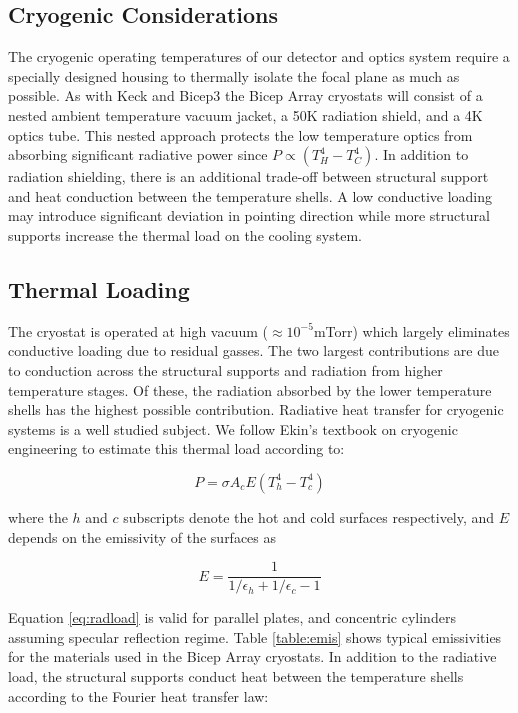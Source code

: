 \documentclass[12pt]{article}
\begin{document}
\subsection{Cryogenic Considerations}
The cryogenic operating temperatures of our detector and optics system require
a specially designed housing to thermally isolate the focal plane as much as
possible. As with Keck and Bicep3 the Bicep Array cryostats will consist of a
nested ambient temperature vacuum jacket, a 50K radiation shield, and a 4K
optics tube. This nested approach protects the low temperature optics
from absorbing significant radiative power since $P\propto (T_{H}^4-T_{C}^4)$.
In addition to radiation shielding, there is an additional trade-off between
structural support and heat conduction between the temperature shells. A low
conductive loading may introduce significant deviation in pointing direction
while more structural supports increase the thermal load on the cooling
system. 

\subsection{Thermal Loading}
The cryostat is operated at high vacuum ($\approx 10^{-5}$mTorr) which largely
eliminates conductive loading due to residual gasses. The two largest
contributions are due to conduction across the structural supports and
radiation from higher temperature stages. Of these, the radiation absorbed by
the lower temperature shells has the highest possible contribution. Radiative
heat transfer for cryogenic systems is a well studied subject. We follow
Ekin's textbook on cryogenic engineering to estimate this thermal load
according to:

\begin{equation}
	P=\sigma A_{c} E (T_{h}^4 - T_{c}^4)
	\label{eq:radload}
\end{equation}

where the $h$ and $c$ subscripts denote the hot and cold surfaces
respectively, and $E$ depends on the emissivity of the surfaces as

\begin{equation}
	E=\frac{1}{1/\epsilon _h + 1/\epsilon _c - 1}
\end{equation}

Equation \ref{eq:radload} is valid for parallel plates, and concentric
cylinders assuming specular reflection regime. Table \ref{table:emis} shows
typical emissivities for the materials used in the Bicep Array cryostats. In
addition to the radiative load, the structural supports conduct heat between
the temperature shells according to the Fourier heat transfer law:
\end{document}
